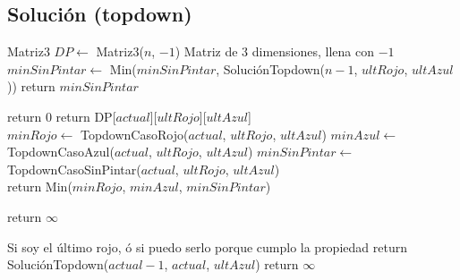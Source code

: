 \subsection{Solución (topdown)}


\begin{algorithm}
\begin{algorithmic}
  \State Matriz3 $DP \gets$ Matriz3($n$, $-1$) \Comment Matriz de 3 dimensiones, llena con $-1$
            \State $minSinPintar \gets$ Min($minSinPintar$, SoluciónTopdown($n-1$, $ultRojo$, $ultAzul$))
        \EndFor
    \EndFor
    \State return $minSinPintar$
\EndProcedure
\end{algorithmic}
\end{algorithm}


\begin{algorithm}
\begin{algorithmic}

        return $0$
    \EndIf
        return DP[$actual$][$ultRojo$][$ultAzul$]
    \EndIf \\

    \State $minRojo \gets$ TopdownCasoRojo($actual$, $ultRojo$, $ultAzul$)
    \State $minAzul \gets$ TopdownCasoAzul($actual$, $ultRojo$, $ultAzul$)
    \State $minSinPintar \gets$ TopdownCasoSinPintar($actual$, $ultRojo$, $ultAzul$) \\

    \State return Min($minRojo$, $minAzul$, $minSinPintar$)
    
\EndProcedure
\end{algorithmic}
\end{algorithm}


\begin{algorithm}
\begin{algorithmic}
        \State return $\infty$
    
    \Else \Comment Si soy el último rojo, ó si puedo serlo porque cumplo la propiedad
            \State return SoluciónTopdown($actual - 1$, $actual$, $ultAzul$)
        \Else 
            \State return $\infty$
        \EndIf 
    \EndIf

\EndProcedure
\end{algorithmic}
\end{algorithm}
